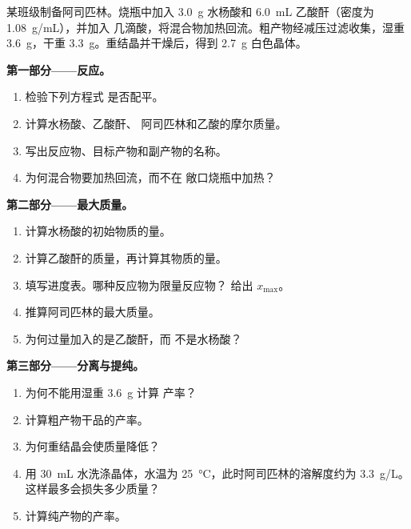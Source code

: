 \begin{problem}
\label{pb:g10:synthesis-yield:1}
某班级制备阿司匹林。烧瓶中加入 \qty{3.0}{g} 水杨酸和
\qty{6.0}{mL} 乙酸酐（密度为 \qty{1.08}{g/mL}），并加入
几滴酸，将混合物加热回流。粗产物经减压过滤收集，湿重
\qty{3.6}{g}，干重 \qty{3.3}{g}。重结晶并干燥后，得到
\qty{2.7}{g} 白色晶体。
%

\medskip
\noindent\textbf{第一部分——反应。}
\begin{enumerate}
  \item 检验下列方程式
         是否配平。
  \item 计算水杨酸、乙酸酐、
        阿司匹林和乙酸的摩尔质量。
  \item 写出反应物、目标产物和副产物的名称。
  \item 为何混合物要加热回流，而不在
        敞口烧瓶中加热？
\end{enumerate}

\medskip
\noindent\textbf{第二部分——最大质量。}
\begin{enumerate}[resume]
  \item 计算水杨酸的初始物质的量。
  \item 计算乙酸酐的质量，再计算其物质的量。
  \item 填写进度表。哪种反应物为限量反应物？
        给出 $x_{\max}$。
  \item 推算阿司匹林的最大质量。
  \item 为何过量加入的是乙酸酐，而
        不是水杨酸？
\end{enumerate}

\medskip
\noindent\textbf{第三部分——分离与提纯。}
\begin{enumerate}[resume]
  \item 为何不能用湿重 \qty{3.6}{g} 计算
        产率？
  \item 计算粗产物干品的产率。
  \item 为何重结晶会使质量降低？
  \item 用 \qty{30}{mL} 水洗涤晶体，水温为
        \qty{25}{\celsius}，此时阿司匹林的溶解度约为
        \qty{3.3}{g/L}。这样最多会损失多少质量？
  \item 计算纯产物的产率。
\end{enumerate}


\end{problem}
